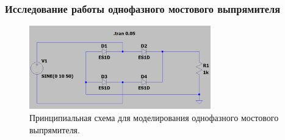 \documentclass[12pt]{article}
\begin{document}
\subsubsection*{Исследование работы однофазного мостового выпрямителя}
\begin{figure}[H]
    \centering
    \includegraphics[width=0.7\textwidth]{3_circuits_scheme.png}
    \caption{Принципиальная схема для моделирования однофазного мостового выпрямителя.}
    \label{fig:3_circuits_scheme.png}
\end{figure}\\
\end{document}
